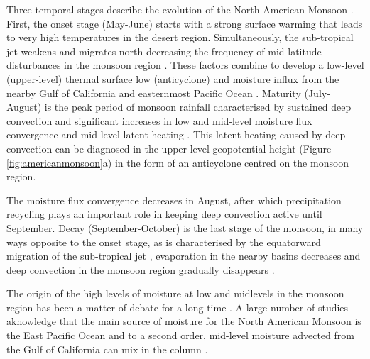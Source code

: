 Three temporal stages describe the evolution of the North American Monsoon \citep{adams1997,geil2013}.
First, the onset stage (May-June) starts with a strong surface warming that leads to very high temperatures in the desert region.
Simultaneously, the sub-tropical jet weakens and migrates north decreasing the frequency of mid-latitude disturbances in the monsoon region \citep{douglas1993,turrent2009}.
These factors combine to develop a low-level (upper-level) thermal surface low (anticyclone) and  moisture influx from the nearby Gulf of California and easternmost Pacific Ocean \citep{douglas1993,geil2013}.
Maturity (July-August) is the peak period of monsoon rainfall characterised by sustained deep convection \citep{barlow1998} and significant increases in low and mid-level moisture flux convergence and mid-level latent heating \citep{adams1997,cook2013}. This latent heating caused by deep convection can be diagnosed in the upper-level geopotential height (Figure \ref{fig:americanmonsoon}a) in the form of an anticyclone centred on the monsoon region. 

The moisture flux convergence decreases in August, after which precipitation recycling \citep{dominguez2008} plays an important role in keeping deep convection active until September.
 Decay (September-October) is the last stage of the monsoon, in many ways opposite to the onset stage, as is characterised by the equatorward migration of the sub-tropical jet \citep{higgins1997,geil2013}, evaporation in the nearby basins decreases and deep convection in the monsoon region gradually disappears \citep{douglas1993}.

 The origin of the high levels of moisture at low and midlevels in the monsoon region has been a matter of debate for a long time \citep{adams1997,barlow1998,vera2006,ordonez2019}.
A large number of studies aknowledge that the main source of moisture for the North American Monsoon is the East Pacific Ocean and to a second order, mid-level moisture advected from the Gulf of California can mix in the column \citep[e.g.][]{adams1997,stensrud1997,vera2006,turrent2009,ordonez2019}.


